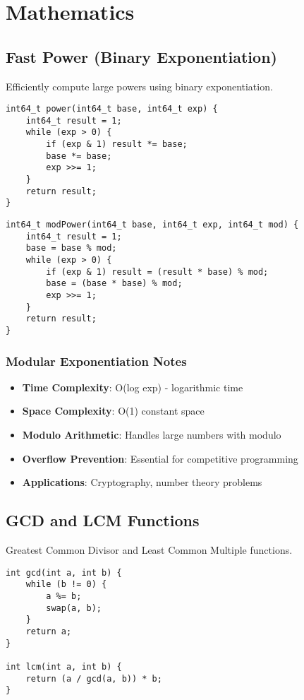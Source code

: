 \documentclass[11pt,a4paper]{article}
\begin{document}
\newpage
\section{Mathematics}

\subsection{Fast Power (Binary Exponentiation)}
Efficiently compute large powers using binary exponentiation.


\begin{lstlisting}[caption={Binary Exponentiation - Iterative}]
int64_t power(int64_t base, int64_t exp) {
    int64_t result = 1;
    while (exp > 0) {
        if (exp & 1) result *= base;
        base *= base;
        exp >>= 1;
    }
    return result;
}
\end{lstlisting}

\begin{lstlisting}[caption={Modular Exponentiation}]
int64_t modPower(int64_t base, int64_t exp, int64_t mod) {
    int64_t result = 1;
    base = base % mod;
    while (exp > 0) {
        if (exp & 1) result = (result * base) % mod;
        base = (base * base) % mod;
        exp >>= 1;
    }
    return result;
}
\end{lstlisting}

\subsubsection*{Modular Exponentiation Notes}
\begin{itemize}
\item \textbf{Time Complexity}: O(log exp) - logarithmic time
\item \textbf{Space Complexity}: O(1) constant space
\item \textbf{Modulo Arithmetic}: Handles large numbers with modulo
\item \textbf{Overflow Prevention}: Essential for competitive programming
\item \textbf{Applications}: Cryptography, number theory problems
\end{itemize}

\newpage
\subsection{GCD and LCM Functions}
Greatest Common Divisor and Least Common Multiple functions.

\begin{lstlisting}[caption={GCD and LCM Functions}]
int gcd(int a, int b) {
    while (b != 0) {
        a %= b;
        swap(a, b);
    }
    return a;
}

int lcm(int a, int b) {
    return (a / gcd(a, b)) * b;
}
\end{lstlisting}
\end{document}
